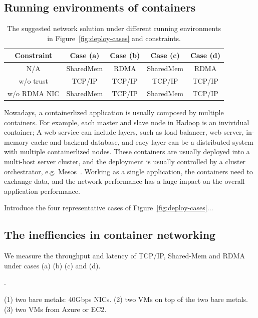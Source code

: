 \subsection{Running environments of containers}

\begin{table} [t!]
\centering
\small
\begin{tabular}{ c || c | c | c | c }
  \hline
  Constraint & Case (a) & Case (b) & Case (c) & Case (d) \\ \hline \hline
  N/A & SharedMem & RDMA & SharedMem & RDMA \\ \hline
  w/o trust & TCP/IP & TCP/IP & TCP/IP & TCP/IP \\ \hline
  w/o RDMA NIC & SharedMem & TCP/IP & SharedMem & TCP/IP \\ \hline
\end{tabular}
\caption{\label{tab:best-network} The suggested network solution under different running environments in Figure~\ref{fig:deploy-cases} and constraints.}
\normalsize
\end{table}

Nowadays, a containerlized application is usually composed by multiple containers. For example, each master and slave node in Hadoop is an invividual container; A web service can include layers, such as load balancer, web server,
in-memory cache and backend database, and eacy layer can be a distributed 
system with multiple containerlized nodes. These containers are usually 
deployed into a multi-host server cluster, and the deployment is usually 
controlled by a cluster orchestrator, e.g. Mesos~\cite{?}. Working as a single 
application, the containers need to exchange data, and the network performance
has a huge impact on the overall application performance. 

Introduce the four representative cases of Figure~\ref{fig:deploy-cases}...

\subsection{The ineffiencies in container networking}

We measure the throughput and latency of TCP/IP, Shared-Mem and RDMA under cases
(a) (b) (c) and (d).

.

(1) two bare metals: 40Gbps NICs.
(2) two VMs on top of the two bare metals.
(3) two VMs from Azure or EC2.

